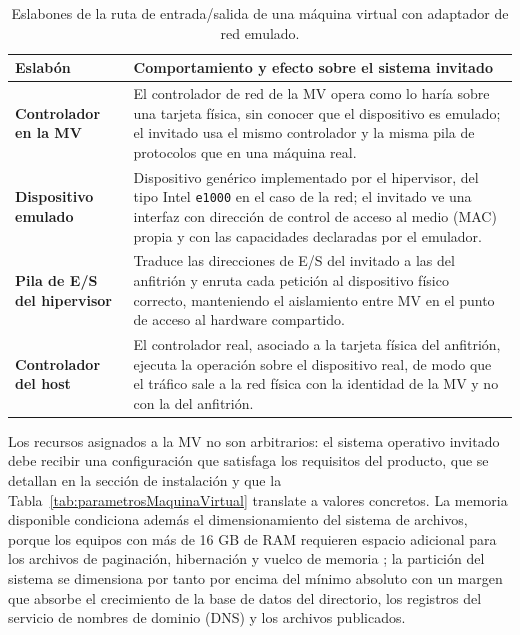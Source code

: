 \documentclass[12pt]{article}
\begin{document}
\begin{table}[htbp]
\centering
\small
\renewcommand{\arraystretch}{1.15}
\renewcommand{\tabularxcolumn}[1]{m{#1}}
\setlength{\emergencystretch}{1.5em}
\caption{Eslabones de la ruta de entrada/salida de una máquina virtual con adaptador de red emulado.}
\label{tab:rutaIoVirtualizada}
\begin{tabularx}{\textwidth}{>{\centering\arraybackslash}m{3.4cm} X}
\toprule
\textbf{Eslabón} & \textbf{Comportamiento y efecto sobre el sistema invitado} \\
\midrule
\textbf{Controlador en la MV} & El controlador de red de la MV opera como lo haría sobre una tarjeta física, sin conocer que el dispositivo es emulado; el invitado usa el mismo controlador y la misma pila de protocolos que en una máquina real. \\
\addlinespace
\textbf{Dispositivo emulado} & Dispositivo genérico implementado por el hipervisor, del tipo Intel \texttt{e1000} en el caso de la red; el invitado ve una interfaz con dirección de control de acceso al medio (MAC) propia y con las capacidades declaradas por el emulador. \\
\addlinespace
\textbf{Pila de E/S del hipervisor} & Traduce las direcciones de E/S del invitado a las del anfitrión y enruta cada petición al dispositivo físico correcto, manteniendo el aislamiento entre MV en el punto de acceso al hardware compartido. \\
\addlinespace
\textbf{Controlador del host} & El controlador real, asociado a la tarjeta física del anfitrión, ejecuta la operación sobre el dispositivo real, de modo que el tráfico sale a la red física con la identidad de la MV y no con la del anfitrión. \\
\bottomrule
\end{tabularx}
\end{table}

Los recursos asignados a la MV no son arbitrarios: el sistema operativo invitado debe recibir una configuración que satisfaga los requisitos del producto, que se detallan en la sección de instalación y que la Tabla~\ref{tab:parametrosMaquinaVirtual} translate a valores concretos. La memoria disponible condiciona además el dimensionamiento del sistema de archivos, porque los equipos con más de 16 GB de RAM requieren espacio adicional para los archivos de paginación, hibernación y vuelco de memoria \parencite{microsoftInstallWs2008r2}; la partición del sistema se dimensiona por tanto por encima del mínimo absoluto con un margen que absorbe el crecimiento de la base de datos del directorio, los registros del servicio de nombres de dominio (DNS) y los archivos publicados.
\end{document}
